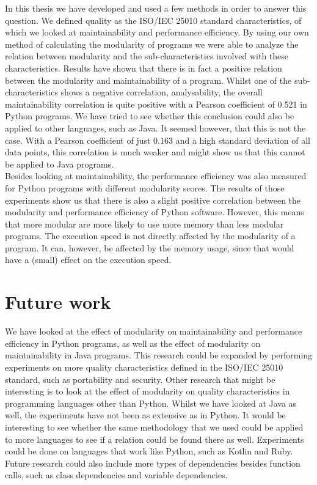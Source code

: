 \documentclass[twoside]{uva-inf-bachelor-thesis}
\begin{document}
In this thesis we have developed and used a few methods in order to answer this question. We defined quality as the ISO/IEC 25010 standard characteristics\cite{ISO25010}, of which we looked at maintainability and performance efficiency. By using our own method of calculating the modularity of programs we were able to analyze the relation between modularity and the sub-characteristics involved with these characteristics. Results have shown that there is in fact a positive relation between the modularity and maintainability of a program. Whilst one of the sub-characteristics shows a negative correlation, analysability, the overall maintainability correlation is quite positive with a Pearson coefficient of 0.521 in Python programs. We have tried to see whether this conclusion could also be applied to other languages, such as Java. It seemed however, that this is not the case. With a Pearson coefficient of just 0.163 and a high standard deviation of all data points, this correlation is much weaker and might show us that this cannot be applied to Java programs.\\

Besides looking at maintainability, the performance efficiency was also measured for Python programs with different modularity scores. The results of those experiments show us that there is also a slight positive correlation between the modularity and performance efficiency of Python software. However, this means that more modular are more likely to use more memory than less modular programs. The execution speed is not directly affected by the modularity of a program. It can, however, be affected by the memory usage, since that would have a (small) effect on the execution speed.

\section{Future work}
We have looked at the effect of modularity on maintainability and performance efficiency in Python programs, as well as the effect of modularity on maintainability in Java programs. This research could be expanded by performing experiments on more quality characteristics defined in the ISO/IEC 25010 standard, such as portability and security. Other research that might be interesting is to look at the effect of modularity on quality characteristics in programming languages other than Python. Whilst we have looked at Java as well, the experiments have not been as extensive as in Python. It would be interesting to see whether the same methodology that we used could be applied to more languages to see if a relation could be found there as well. Experiments could be done on languages that work like Python, such as Kotlin and Ruby. Future research could also include more types of dependencies besides function calls, such as class dependencies and variable dependencies.
\end{document}
